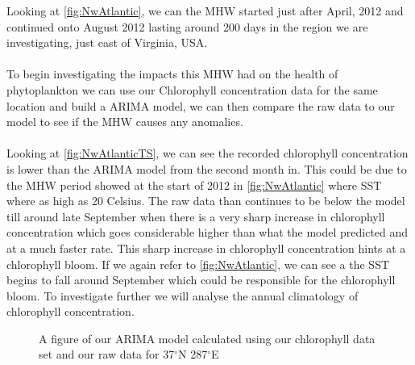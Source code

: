 \noindent Looking at \autoref{fig:NwAtlantic}, we can the MHW started just after April, 2012 and continued onto August 2012 lasting around 200 days in the region we are investigating, just east of Virginia, USA.
\\\\
To begin investigating the impacts this MHW had on the health of phytoplankton we can use our Chlorophyll concentration data for the same location and build a ARIMA model, we can then compare the raw data to our model to see if the MHW causes any anomalies.
\\\\
Looking at \autoref{fig:NwAtlanticTS}, we can see the recorded chlorophyll concentration is lower than the ARIMA model from the second month in. This could be due to the MHW period showed at the start of 2012 in \autoref{fig:NwAtlantic} where SST where as high as 20 Celsius. The raw data than continues to be below the model till around late September when there is a very sharp increase in chlorophyll concentration which goes considerable higher than what the model predicted and at a much faster rate. This sharp increase in chlorophyll concentration hints at a chlorophyll bloom. If we again refer to \autoref{fig:NwAtlantic}, we can see a the SST begins to fall around September which could be responsible for the chlorophyll bloom. To investigate further we will analyse the annual climatology of chlorophyll concentration.

\begin{figure}[H]
\centering
            \caption{A figure of our ARIMA model calculated using our chlorophyll data set and our raw data for 37$^{\circ}$N 287$^{\circ}$E}
            \label{fig:NwAtlanticTS}
\end{figure}

